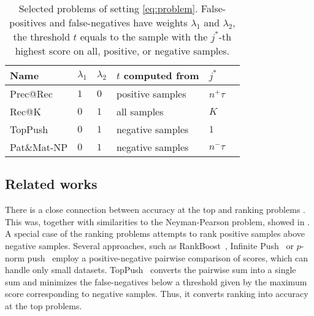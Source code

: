 \begin{table}[!ht]
  \centering
  \begin{tabular}{@{}llllll@{}}
    \toprule
    Name & $\lambda_1$ & $\lambda_2$ & $t$ computed from & $j^*$ \\
    \midrule
    Prec@Rec    & $1$ & $0$ & positive samples & $n^+\tau$ \\
    Rec@K       & $0$ & $1$ & all samples      & $K$ \\
    TopPush     & $0$ & $1$ & negative samples & $1$ \\
    Pat\&Mat-NP & $0$ & $1$ & negative samples & $n^-\tau$ \\
    \bottomrule
  \end{tabular}
  \caption{Selected problems of setting \eqref{eq:problem}. False-positives and false-negatives have weights $\lambda_1$ and $\lambda_2$, the threshold $t$ equals to the sample with the $j^*$-th highest score on all, positive, or negative samples.}
  \label{table:summary}
\end{table}

\subsection{Related works}

There is a close connection between accuracy at the top and ranking problems \cite{batmaz2019review,werner2019review}. This was, together with similarities to the Neyman-Pearson problem, showed in \cite{adam2019patmat}. A special case of the ranking problems attempts to rank positive samples above negative samples. Several approaches, such as RankBoost~\cite{freund2003efficient}, Infinite Push~\cite{agarwal2011infinite} or $p$-norm push~\cite{rudin2009pnorm} employ a positive-negative pairwise comparison of scores, which can handle only small datasets. TopPush~\cite{li2014top} converts the pairwise sum into a single sum and minimizes the false-negatives below a threshold given by the maximum score corresponding to negative samples. Thus, it converts ranking into accuracy at the top problems.

